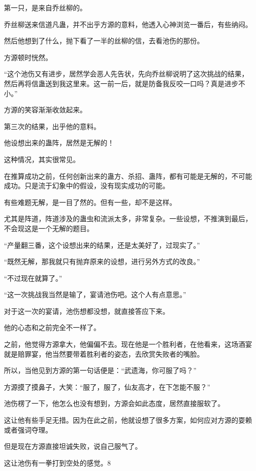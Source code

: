 \begin{this_body}
第一只，是来自乔丝柳的。

乔丝柳送来信道凡蛊，并不出乎方源的意料，他透入心神浏览一番后，有些纳闷。

然后他想到了什么，抛下看了一半的丝柳的信，去看池伤的那份。

方源顿时恍然。

“这个池伤又有进步，居然学会恶人先告状，先向乔丝柳说明了这次挑战的结果，然后再将信蛊送到我这里来。这一前一后，就是防备我反咬一口吗？真是进步不小。”

方源的笑容渐渐收敛起来。

第三次的结果，出乎他的意料。

他设想出来的蛊阵，居然是无解的！

这种情况，其实很常见。

在推算成功之前，任何创新出来的蛊方、杀招、蛊阵，都有可能是无解的，不可能成功。只是流于幻象中的假设，没有现实成功的可能。

有些难题无解，是一目了然的。但有一些，却不是这样。

尤其是阵道，阵道涉及的蛊虫和流派太多，非常复杂。一些设想，不推演到最后，不会现这是一个无解的题目。

“产量翻三番，这个设想出来的结果，还是太美好了，过现实了。”

“既然无解，那我就只有抛弃原来的设想，进行另外方式的改良。”

“不过现在就算了。”

“这一次挑战我当然是输了，宴请池伤吧。这个人有点意思。”

对于这一次的宴请，池伤想都没想，就直接答应下来。

他的心态和之前完全不一样了。

之前，他觉得方源拿大，他偏偏不去。现在他是一个胜利者，在他看来，这场酒宴就是赔罪宴，他当然要带着胜利者的姿态，去欣赏失败者的嘴脸。

所以，当他见到方源的第一句话便是：“武遗海，你可服了吗？”

方源摸了摸鼻子，大笑：“服了，服了，仙友高才，在下怎能不服？”

池伤楞了一下，他怎么也没有想到，方源会如此态度，居然直接服软了。

这让他有些手足无措。因为在此之前，他就设想了很多方案，如何应对方源的耍赖或者强词夺理。

但是现在方源直接坦诚失败，说自己服气了。

这让池伤有一拳打到空处的感觉。8

\end{this_body}

